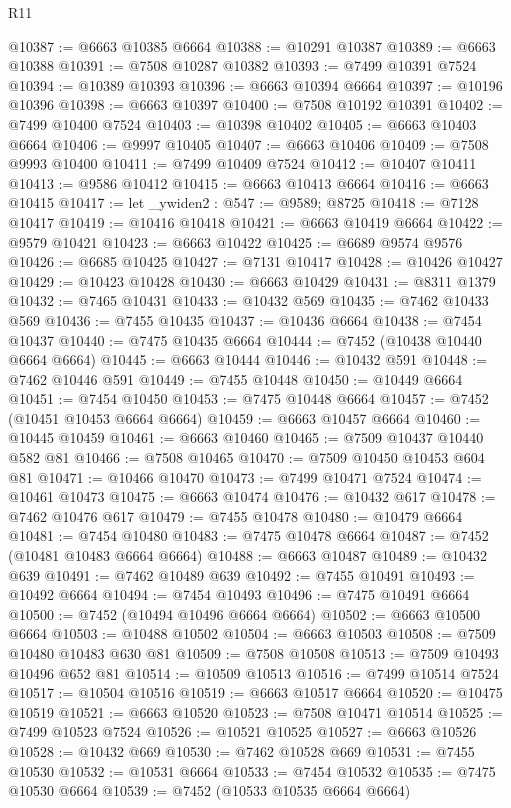 \begin{lexlean}{R11}
\begin{coremodule}
{{{{{{{{{{{{{{{{{{{{{{{{{{{{{{{{{{{{{{{{{{{{{{{{{{{{{{{{{{{{{{{{{{{{{{{{{{{{{{{{{{@10387 := @6663 @10385 @6664
@10388 := @10291 @10387
@10389 := @6663 @10388
@10391 := @7508 @10287 @10382
@10393 := @7499 @10391 @7524
@10394 := @10389 @10393
@10396 := @6663 @10394 @6664
@10397 := @10196 @10396
@10398 := @6663 @10397
@10400 := @7508 @10192 @10391
@10402 := @7499 @10400 @7524
@10403 := @10398 @10402
@10405 := @6663 @10403 @6664
@10406 := @9997 @10405
@10407 := @6663 @10406
@10409 := @7508 @9993 @10400
@10411 := @7499 @10409 @7524
@10412 := @10407 @10411
@10413 := @9586 @10412
@10415 := @6663 @10413 @6664
@10416 := @6663 @10415
@10417 := let _ywiden2 : @547 := @9589; @8725
@10418 := @7128 @10417
@10419 := @10416 @10418
@10421 := @6663 @10419 @6664
@10422 := @9579 @10421
@10423 := @6663 @10422
@10425 := @6689 @9574 @9576
@10426 := @6685 @10425
@10427 := @7131 @10417
@10428 := @10426 @10427
@10429 := @10423 @10428
@10430 := @6663 @10429
@10431 := @8311 @1379
@10432 := @7465 @10431
@10433 := @10432 @569
@10435 := @7462 @10433 @569
@10436 := @7455 @10435
@10437 := @10436 @6664
@10438 := @7454 @10437
@10440 := @7475 @10435 @6664
@10444 := @7452 (@10438 @10440 @6664 @6664)
@10445 := @6663 @10444
@10446 := @10432 @591
@10448 := @7462 @10446 @591
@10449 := @7455 @10448
@10450 := @10449 @6664
@10451 := @7454 @10450
@10453 := @7475 @10448 @6664
@10457 := @7452 (@10451 @10453 @6664 @6664)
@10459 := @6663 @10457 @6664
@10460 := @10445 @10459
@10461 := @6663 @10460
@10465 := @7509 @10437 @10440 @582 @81
@10466 := @7508 @10465
@10470 := @7509 @10450 @10453 @604 @81
@10471 := @10466 @10470
@10473 := @7499 @10471 @7524
@10474 := @10461 @10473
@10475 := @6663 @10474
@10476 := @10432 @617
@10478 := @7462 @10476 @617
@10479 := @7455 @10478
@10480 := @10479 @6664
@10481 := @7454 @10480
@10483 := @7475 @10478 @6664
@10487 := @7452 (@10481 @10483 @6664 @6664)
@10488 := @6663 @10487
@10489 := @10432 @639
@10491 := @7462 @10489 @639
@10492 := @7455 @10491
@10493 := @10492 @6664
@10494 := @7454 @10493
@10496 := @7475 @10491 @6664
@10500 := @7452 (@10494 @10496 @6664 @6664)
@10502 := @6663 @10500 @6664
@10503 := @10488 @10502
@10504 := @6663 @10503
@10508 := @7509 @10480 @10483 @630 @81
@10509 := @7508 @10508
@10513 := @7509 @10493 @10496 @652 @81
@10514 := @10509 @10513
@10516 := @7499 @10514 @7524
@10517 := @10504 @10516
@10519 := @6663 @10517 @6664
@10520 := @10475 @10519
@10521 := @6663 @10520
@10523 := @7508 @10471 @10514
@10525 := @7499 @10523 @7524
@10526 := @10521 @10525
@10527 := @6663 @10526
@10528 := @10432 @669
@10530 := @7462 @10528 @669
@10531 := @7455 @10530
@10532 := @10531 @6664
@10533 := @7454 @10532
@10535 := @7475 @10530 @6664
@10539 := @7452 (@10533 @10535 @6664 @6664)
}}}}}}}}}}}}}}}}}}}}}}}}}}}}}}}}}}}}}}}}}}}}}}}}}}}}}}}}}}}}}}}}}}}}}}}}}}}}}}}}}}
\end{coremodule}
\end{lexlean}
